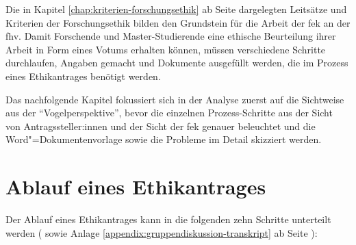 \documentclass[a4paper,12pt,twoside]{scrreprt}
\begin{document}
Die in Kapitel \ref{chap:kriterien-forschungsethik} ab Seite \pageref{chap:kriterien-forschungsethik} dargelegten Leitsätze und Kriterien der Forschungsethik bilden den Grundstein für die Arbeit der \acl{fek} an der \acl{fhv}. Damit Forschende und Master-Studierende eine ethische Beurteilung ihrer Arbeit in Form eines Votums erhalten können, müssen verschiedene Schritte durchlaufen, Angaben gemacht und Dokumente ausgefüllt werden, die im Prozess eines Ethikantrages benötigt werden.

\medskip

Das nachfolgende Kapitel fokussiert sich in der Analyse zuerst auf die Sichtweise aus der \enquote{Vogelperspektive}, bevor die einzelnen Prozess-Schritte aus der Sicht von Antragssteller:innen und der Sicht der \ac{fek} genauer beleuchtet und die Word"=Dokumentenvorlage sowie die Probleme im Detail skizziert werden.

\section{Ablauf eines Ethikantrages}
\label{sec:ablauf-ethikantrag}

Der Ablauf eines Ethikantrages kann in die folgenden zehn Schritte unterteilt werden (\cite{fachhochschule_vorarlberg_gmbh_forschungsethik-kommission_2021, forschungsethik-kommission_der_fachhochschule_vorarlberg_verfahrensordnung_2020} sowie Anlage \ref{appendix:gruppendiskussion-transkript} ab Seite \pageref{appendix:gruppendiskussion-transkript}):
\end{document}

